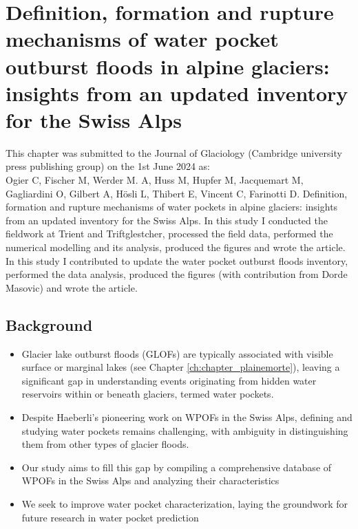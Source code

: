 \chapter{Definition, formation and rupture mechanisms of water pocket outburst floods in alpine glaciers: insights from an updated inventory for the Swiss Alps}
\label{ch:chapter_WPOFs}

This chapter was submitted to the Journal of Glaciology (Cambridge university press publishing
group) on the 1st June 2024 as:\\
Ogier C, Fischer M, Werder M. A, Huss M, Hupfer M, Jacquemart M, Gagliardini O, Gilbert A, Hösli L, Thibert E, Vincent C, Farinotti D. Definition, formation and rupture mechanisms of water pockets in alpine glaciers: insights from an updated inventory for the Swiss Alps. In this study I conducted the fieldwork at Trient and Triftglestcher, processed the field data, performed the numerical modelling and its analysis, produced the figures and wrote the article. 
In this study I contributed to update the water pocket outburst floods inventory, performed the data analysis, produced the figures (with contribution from Dorde Masovic) and wrote the article. 


\section{Background}

\begin{itemize}


        \item  Glacier lake outburst floods (GLOFs) are typically associated with visible surface or marginal lakes (see Chapter \ref{ch:chapter_plainemorte}), leaving a significant gap in understanding events originating from hidden water reservoirs within or beneath glaciers, termed water pockets.

        \item Despite Haeberli's pioneering work on WPOFs in the Swiss Alps, defining and studying water pockets remains challenging, with ambiguity in distinguishing them from other types of glacier floods.

        \item Our study aims to fill this gap by compiling a comprehensive database of WPOFs in the Swiss Alps and analyzing their characteristics

        \item We seek to improve water pocket characterization, laying the groundwork for future research in water pocket prediction

    \end{itemize}

